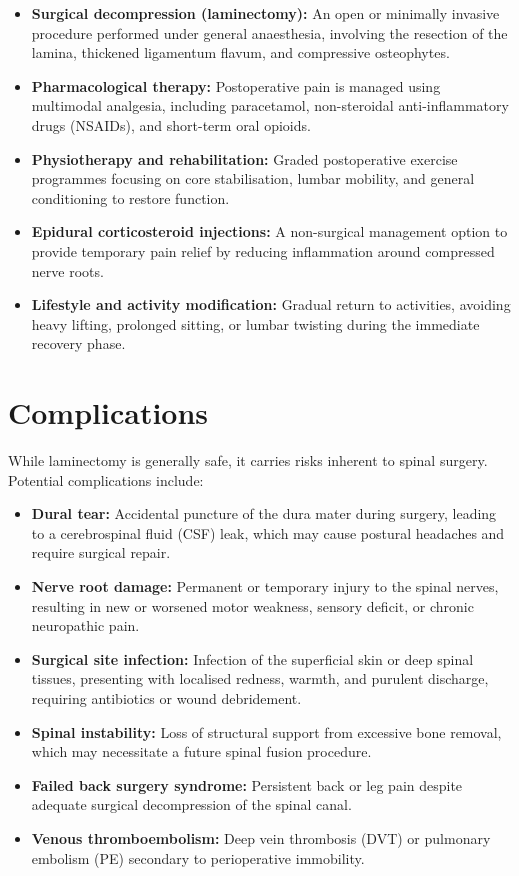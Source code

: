 \begin{itemize}
    \item \textbf{Surgical decompression (laminectomy):} An open or minimally invasive procedure performed under general anaesthesia, involving the resection of the lamina, thickened ligamentum flavum, and compressive osteophytes.
    \item \textbf{Pharmacological therapy:} Postoperative pain is managed using multimodal analgesia, including paracetamol, non-steroidal anti-inflammatory drugs (NSAIDs), and short-term oral opioids.
    \item \textbf{Physiotherapy and rehabilitation:} Graded postoperative exercise programmes focusing on core stabilisation, lumbar mobility, and general conditioning to restore function.
    \item \textbf{Epidural corticosteroid injections:} A non-surgical management option to provide temporary pain relief by reducing inflammation around compressed nerve roots.
    \item \textbf{Lifestyle and activity modification:} Gradual return to activities, avoiding heavy lifting, prolonged sitting, or lumbar twisting during the immediate recovery phase.
\end{itemize}

\section*{Complications}
While laminectomy is generally safe, it carries risks inherent to spinal surgery. Potential complications include:

\begin{itemize}
    \item \textbf{Dural tear:} Accidental puncture of the dura mater during surgery, leading to a cerebrospinal fluid (CSF) leak, which may cause postural headaches and require surgical repair.
    \item \textbf{Nerve root damage:} Permanent or temporary injury to the spinal nerves, resulting in new or worsened motor weakness, sensory deficit, or chronic neuropathic pain.
    \item \textbf{Surgical site infection:} Infection of the superficial skin or deep spinal tissues, presenting with localised redness, warmth, and purulent discharge, requiring antibiotics or wound debridement.
    \item \textbf{Spinal instability:} Loss of structural support from excessive bone removal, which may necessitate a future spinal fusion procedure.
    \item \textbf{Failed back surgery syndrome:} Persistent back or leg pain despite adequate surgical decompression of the spinal canal.
    \item \textbf{Venous thromboembolism:} Deep vein thrombosis (DVT) or pulmonary embolism (PE) secondary to perioperative immobility.
\end{itemize}


